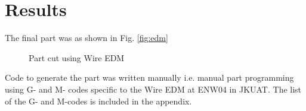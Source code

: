 \section{Results}
The final part was as shown in Fig. \ref{fig:edm}
\begin{figure}[!h]%
	\centering
	\qquad
	\caption[Final part]{Part cut using Wire EDM}%
	\label{fig:result}%
\end{figure}
Code to generate the part was written manually i.e. manual part programming using G- and M- codes specific to the Wire EDM at ENW04 in JKUAT. The list of the G- and M-codes is included in the appendix.